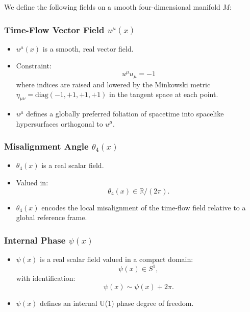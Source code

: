 \documentclass[12pt]{article}
\begin{document}
We define the following fields on a smooth four-dimensional manifold \( M \):

\subsubsection{Time-Flow Vector Field \( u^\mu(x) \)}
\begin{itemize}
    \item \( u^\mu(x) \) is a smooth, real vector field.
    \item Constraint:
    \[
    u^\mu u_\mu = -1
    \]
    where indices are raised and lowered by the Minkowski metric \( \eta_{\mu\nu} = \text{diag}(-1, +1, +1, +1) \) in the tangent space at each point.
    \item \( u^\mu \) defines a globally preferred foliation of spacetime into spacelike hypersurfaces orthogonal to \( u^\mu \).
\end{itemize}

\subsubsection{Misalignment Angle \( \theta_4(x) \)}
\begin{itemize}
    \item \( \theta_4(x) \) is a real scalar field.
    \item Valued in:
    \[
    \theta_4(x) \in \mathbb{R} / (2\pi).
    \]
    \item \( \theta_4(x) \) encodes the local misalignment of the time-flow field relative to a global reference frame.
\end{itemize}

\subsubsection{Internal Phase \( \psi(x) \)}
\begin{itemize}
    \item \( \psi(x) \) is a real scalar field valued in a compact domain:
    \[
    \psi(x) \in S^1,
    \]
    with identification:
    \[
    \psi(x) \sim \psi(x) + 2\pi.
    \]
    \item \( \psi(x) \) defines an internal U(1) phase degree of freedom.
\end{itemize}
\end{document}
